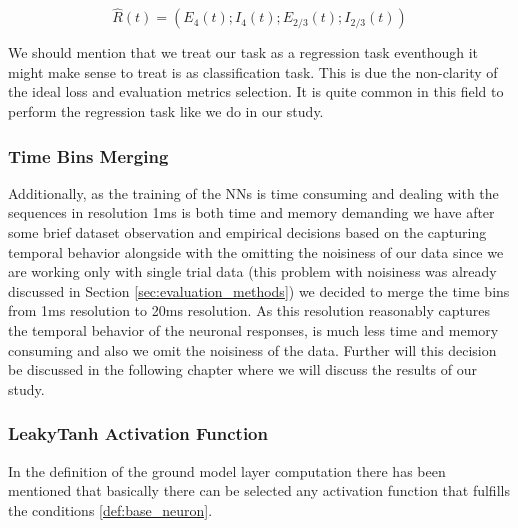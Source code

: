 $$\hat{R}(t) = (E_4(t); I_4(t); E_{2/3}(t); I_{2/3}(t)) $$

We should mention that we treat our task as a regression task eventhough it might make sense to treat is as classification task. This is due the non-clarity of the ideal loss and evaluation metrics selection. It is quite common in this field to perform the regression task like we do in our study.

\subsubsection{Time Bins Merging}
\label{subsubsec:time_bins_merging}

Additionally, as the training of the NNs is time consuming and dealing with the sequences in resolution 1ms is both time and memory demanding we have after some brief dataset observation and empirical decisions based on the capturing temporal behavior alongside with the omitting the noisiness of our data since we are working only with single trial data (this problem with noisiness was already discussed in Section \ref{sec:evaluation_methods}) we decided to merge the time bins from 1ms resolution to 20ms resolution. As this resolution reasonably captures the temporal behavior of the neuronal responses, is much less time and memory consuming and also we omit the noisiness of the data. Further will this decision be discussed in the following chapter where we will discuss the results of our study.

\subsubsection{LeakyTanh Activation Function}
\label{subsubsec:leakytanh}

In the definition of the ground model layer computation there has been mentioned that basically there can be selected any activation function that fulfills the conditions \ref{def:base_neuron}.

